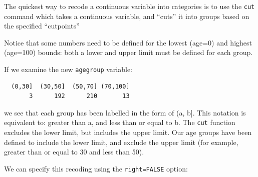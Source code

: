 \documentclass[
  a4paper,
]{memoir}
\newenvironment{Shaded}{\begin{snugshade}}{\end{snugshade}}
\newcommand{\AttributeTok}[1]{\textcolor[rgb]{0.00,0.00,0.00}{#1}}
\newcommand{\ConstantTok}[1]{\textcolor[rgb]{0.00,0.00,0.00}{#1}}
\newcommand{\DecValTok}[1]{\textcolor[rgb]{0.00,0.00,0.00}{#1}}
\newcommand{\FunctionTok}[1]{\textcolor[rgb]{0.00,0.00,0.00}{#1}}
\newcommand{\NormalTok}[1]{\textcolor[rgb]{0.00,0.00,0.00}{#1}}
\newcommand{\OtherTok}[1]{\textcolor[rgb]{0.00,0.00,0.00}{#1}}
\newcommand{\SpecialCharTok}[1]{\textcolor[rgb]{0.00,0.00,0.00}{#1}}
\begin{document}
The quickest way to recode a continuous variable into categories is to
use the \texttt{cut} command which takes a continuous variable, and
``cuts'' it into groups based on the specified ``cutpoints''

\begin{Shaded}
\end{Shaded}

Notice that some numbers need to be defined for the lowest (age=0) and
highest (age=100) bounds: both a lower and upper limit must be defined
for each group.

If we examine the new \texttt{agegroup} variable:

\begin{Shaded}
\end{Shaded}

\begin{verbatim}
  (0,30]  (30,50]  (50,70] (70,100] 
       3      192      210       13 
\end{verbatim}

we see that each group has been labelled in the form of (a, b{]}. This
notation is equivalent to: greater than a, and less than or equal to b.
The \texttt{cut} function excludes the lower limit, but includes the
upper limit. Our age groups have been defined to include the lower
limit, and exclude the upper limit (for example, greater than or equal
to 30 and less than 50).

We can specify this recoding using the \texttt{right=FALSE} option:

\begin{Shaded}
\end{Shaded}
\end{document}
